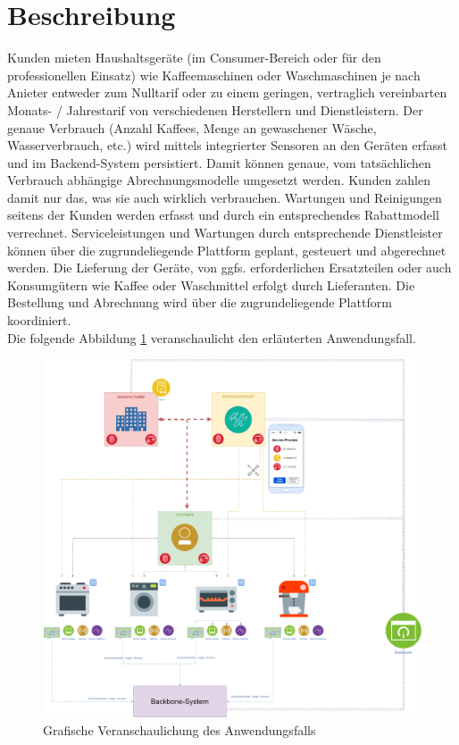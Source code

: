 \section{Beschreibung}
\label{sec:iot_usecase:description}
Kunden mieten Haushaltsgeräte (im Consumer-Bereich oder für den professionellen Einsatz) wie Kaffeemaschinen oder Waschmaschinen je nach Anieter entweder zum Nulltarif oder zu einem geringen, vertraglich vereinbarten Monats- / Jahrestarif von verschiedenen Herstellern und Dienstleistern. Der genaue Verbrauch (Anzahl Kaffees, Menge an gewaschener Wäsche, Wasserverbrauch, etc.) wird mittels integrierter Sensoren an den Geräten erfasst und im Backend-System persistiert. Damit können genaue, vom tatsächlichen Verbrauch abhängige Abrechnungsmodelle umgesetzt werden. Kunden zahlen damit nur das, was sie auch wirklich verbrauchen. Wartungen und Reinigungen seitens der Kunden werden erfasst und durch ein entsprechendes Rabattmodell verrechnet. Serviceleistungen und Wartungen durch entsprechende Dienstleister können über die zugrundeliegende Plattform geplant, gesteuert und abgerechnet werden. Die Lieferung der Geräte, von ggfs. erforderlichen Ersatzteilen oder auch Konsumgütern wie Kaffee oder Waschmittel erfolgt durch Lieferanten. Die Bestellung und Abrechnung wird über die zugrundeliegende Plattform koordiniert.\\
Die folgende Abbildung \ref{fig:chapter04:usecase} veranschaulicht den erläuterten Anwendungsfall.

\begin{figure}[htbp]
 \centering
 \includegraphics[width=1.0\textwidth]{gfx/IOT-Anwendungsfall.png}
 \caption{Grafische Veranschaulichung des Anwendungsfalls}
 \label{fig:chapter04:usecase}
\end{figure}



